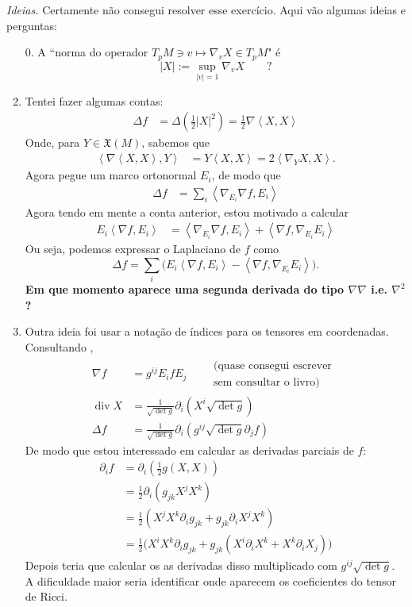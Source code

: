 \textit{Ideias.} \hspace{.5em} Certamente não consegui resolver esse exercício. Aqui vão algumas ideias e perguntas:
\begin{enumerate}
	\item[0.] A ``norma do operador \(T_pM \ni v \mapsto \nabla_vX \in T_p M\)" é
		\[|X|:=\operatorname{sup}_{|v|=1}\nabla_vX\qquad ?\]
		
	\item Tentei fazer algumas contas:
		\begin{align*}
\Delta f&=\Delta \left(\frac{1}{2}|X|^2\right) =\frac{1}{2}\nabla \left<X,X\right>
\end{align*}
Onde, para \(Y \in \mathfrak{X}(M)\), sabemos que
\begin{align*}
\left<\nabla \left<X,X\right>,Y\right>&=Y\left<X,X\right>=2\left<\nabla_YX,X\right>.
\end{align*}
Agora pegue um marco ortonormal \(E_i\), de modo que
\begin{align*}
\Delta f&=\sum_{i} \left<\nabla_{E_i}\nabla f,E_i\right>
\end{align*}
Agora tendo em mente a conta anterior, estou motivado a calcular
\begin{align*}
E_i\left<\nabla f,E_i\right>&=\left<\nabla_{E_i}\nabla f,E_i\right>+\left<\nabla f,\nabla_{E_i}E_i\right>
\end{align*}
Ou seja, podemos expressar o Laplaciano de \(f\) como
\[\Delta f = \sum_{i}\Big(E_i\left<\nabla f,E_i\right>-\left<\nabla f,\nabla_{E_i}E_i\right>\Big).\]
\textbf{Em que momento aparece uma segunda derivada do tipo \(\nabla \nabla\) i.e. \(\nabla^2\)?} 

\item Outra ideia foi usar a notação de índices para os tensores em coordenadas. Consultando \cite{ler},
\begin{align*}
	\nabla f&=g^{ij}E_ifE_j\qquad \substack{\text{(quase consegui escrever }\\\text{sem consultar o livro)}}\\
\operatorname{div}X&=\frac{1}{\sqrt{\det g}} \partial_i(X^i \sqrt{\det g})\\
\Delta f&=\frac{1}{\sqrt{\det g} }\partial_i\left(g^{ij}\sqrt{\det g}\partial_j f\right)
\end{align*}
De modo que estou interessado em calcular as derivadas parciais de \(f\):
\begin{align*}
\partial_if&=\partial_i\left(\frac{1}{2}g(X,X)\right)\\
&=\frac{1}{2}\partial_i (g_{jk}X^jX^k)\\
&=\frac{1}{2}\left(X^jX^k\partial_i g_{j k}+g_{j k}\partial_i X^jX^k\right) \\
&=\frac{1}{2}\big(X^iX^k \partial_i g_{j k}+g_{j k}(X^i \partial_i X^k+X^k \partial_i X_j)\big) 
\end{align*}
Depois teria que calcular os as derivadas disso multiplicado com \(g^{ij}\sqrt{\det g}\). A dificuldade maior seria identificar onde aparecem os coeficientes do tensor de Ricci.


\end{enumerate}
